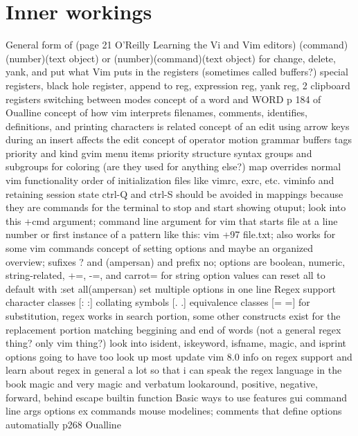 \documentclass[12pt]{book}
\begin{document}
\section{Inner workings}
General form of (page 21 O'Reilly Learning the Vi and Vim editors) (command)(number)(text object) or (number)(command)(text object) for change, delete, yank, and put
what Vim puts in the registers (sometimes called buffers?) special registers, black hole register, append to reg, expression reg, yank reg, 2 clipboard registers
switching between modes
concept of a word and WORD p 184 of Oualline
  concept of how vim interprets filenames, comments, identifies, definitions, and printing characters is related
concept of an edit
  using arrow keys during an insert affects the edit
concept of operator motion grammar
buffers
tags priority and kind
gvim menu items priority structure
syntax groups and subgroups for coloring (are they used for anything else?)
map overrides normal vim functionality
order of initialization files like vimrc, exrc, etc.
viminfo and retaining session state
ctrl-Q and ctrl-S should be avoided in mappings because they are commands for the terminal to stop and start showing otuput; look into this
+cmd argument; command line argument for vim that starts file at a line number or first instance of a pattern like this: vim +97 file.txt; also works for some vim commands
concept of setting options and maybe an organized overview; sufixes ? and (ampersan) and prefix no;
  options are boolean, numeric, string-related,
    +=, -=, and carrot= for string option values
    can reset all to default with :set all(ampersan)
    set multiple options in one line
Regex support
  character classes [: :]
  collating symbols [. .]
  equivalence classes [= =]
  for substitution, regex works in search portion, some other constructs exist for the replacement portion
  matching beggining and end of words (not a general regex thing? only vim thing?)
  look into isident, iskeyword, isfname, magic, and isprint options
  going to have too look up most update vim 8.0 info on regex support and learn about regex in general a lot so that i can speak the regex language in the book
  magic and very magic and verbatum
  lookaround, positive, negative, forward, behind
  escape builtin function
Basic ways to use features
  gui
  command line args
  options
  ex commands
  mouse
	modelines; comments that define options automatially p268 Oualline
\end{document}
